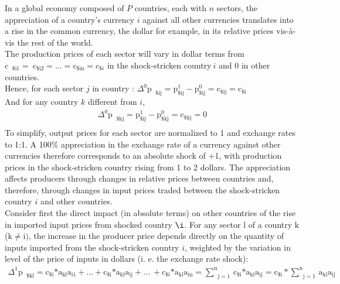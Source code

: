 \documentclass[11pt,a4paper]{article}
\begin{document}
In a global economy composed of $P$ countries, each with $n$ sectors, the appreciation of a country's currency $i$ against all other currencies translates into a rise in the common currency, the dollar for example, in its relative prices vis-à-vis the rest of the world. \\ 
The production prices of each sector will vary in dollar terms from ${{\text{c}}_{\text{ }\!\!\$\!\!\text{i}1}}=\text{}\!\!~\!\!\text{}{{\text{c}}_{\text{}\!\!\$\!\!\text{i}2}}=\ldots={{\text{c}}_{\text{}\!\!\$\!\!\text{in}}}={{c}_{\$i}}$ in the shock-stricken country$~i$ and 0 in other countries. \\
Hence, for each sector $j$ in country  : ${{\Delta }^{0}}{{\text{p}}_{\text{ }\!\!\$\!\!\text{ij}}}=\text{p}_{\text{}\!\!\$\!\!\text{ij}}^{1}-\text{p}_{\text{}\!\!\$\!\!\text{ij}}^{0}={{\text{c}}_{\text{}\!\!\$\!\!\text{ij}}}={{\text{c}}_{\text{}\!\!\$\!\!\text{i}}}$ \\
And for any country $k$ different from $i$,
\begin{eqnarray}
 {{\Delta }^{0}}{{\text{p}}_{\text{ }\!\!\$\!\!\text{kj}}}=\text{p}_{\text{}\!\!\$\!\!\text{ij}}^{1}-\text{p}_{\text{}\!\!\$\!\!\text{kj}}^{0}={{\text{c}}_{\text{}\!\!\$\!\!\text{kj}}}=0  \\
 \end{eqnarray}	
To simplify, output prices for each sector are normalized to 1 and exchange rates to 1:1. A 100$\%$ appreciation in the exchange rate of a currency against other currencies therefore corresponds to an absolute shock of +1, with production prices in the shock-stricken country rising from 1 to 2 dollars. The appreciation affects producers through changes in relative prices between countries and, therefore, through changes in input prices traded between the shock-stricken country $i$ and other countries. \\
Consider first the direct impact (in absolute terms) on other countries of the rise in imported input prices from shocked country $\i$. For any sector l of a country $\text{k}$ ($\text{k}\ne \text{i})$, the increase in the producer price depends directly on the quantity of inputs imported from the shock-stricken country $i$, weighted by the variation in level of the price of inputs in dollars (i. e. the exchange rate shock):\\
\begin{eqnarray}
{{\Delta }^{1}}{{\text{p}}_{\text{ }\!\!\$\!\!\text{kl}}}={{\text{c}}_{\text{}\!\!\$\!\!\text{i}}}\text{*}{{\text{a}}_{\text{kl}}}{{\text{a}}_{\text{i}1}}+\ldots+{{\text{c}}_{\text{}\!\!\$\!\!\text{i}}}\text{*}{{\text{a}}_{\text{kl}}}{{\text{a}}_{\text{ij}}}+\ldots\text{}\!\!~\!\!\text{}+{{\text{c}}_{\text{}\!\!\$\!\!\text{i}}}\text{*}{{\text{a}}_{\text{kl}}}{{\text{a}}_{\text{in}}}=\underset{\text{j}=1}{\overset{\text{n}}{\mathop\sum}}\,{{\text{c}}_{\text{}\!\!\$\!\!\text{i}}}\text{*}{{\text{a}}_{\text{kl}}}{{\text{a}}_{\text{ij}}}={{\text{c}}_{\text{}\!\!\$\!\!\text{i}}}*\underset{\text{j}=1}{\overset{\text{n}}{\mathop\sum}}\,{{\text{a}}_{\text{kl}}}{{\text{a}}_{\text{ij}}}   \\
\end{eqnarray}
\end{document}
